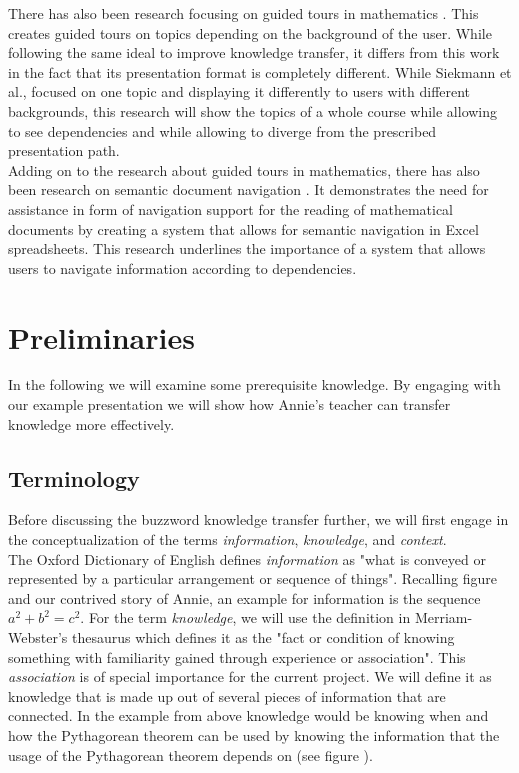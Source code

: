\documentclass[twoside, 12pt]{article}
\begin{document}
There has also been research focusing on guided tours in mathematics \cite{SieBen:acgap00}. This creates guided tours on topics depending on the background of the user. While following the same ideal to improve knowledge transfer, it differs from this work in the fact that its presentation format is completely different. While Siekmann et al., focused on one topic and displaying it differently to users with different backgrounds, this research will show the topics of a whole course while allowing to see dependencies and while allowing to diverge from the prescribed presentation path.\\

Adding on to the research about guided tours in mathematics, there has also been research on semantic document navigation \cite{Koh:NavigationInMathDocs2012}. It demonstrates the need for assistance in form of navigation support for the reading of mathematical documents by creating a system that allows for semantic navigation in Excel spreadsheets. This research underlines the importance of a system that allows users to navigate information according to dependencies.\\
  
\section{Preliminaries}
\label{sec:preliminaries}

In the following we will examine some prerequisite knowledge. By engaging with our example presentation we will show how Annie's teacher can transfer knowledge more effectively.\\

\subsection{Terminology}
\label{sec:terminology}

Before discussing the buzzword knowledge transfer further, we will first engage in the conceptualization of the terms \textit{information}, \textit{knowledge}, and \textit{context}.\\

The Oxford Dictionary of English \cite{OED:npentrel14} defines \textit{information} as "what is conveyed or represented by a particular arrangement or sequence of things". Recalling figure %
 and our contrived story of Annie, an example for information is the sequence \textit{$a^2 + b^2 = c^2$}. For the term \textit{knowledge}, we will use the definition in Merriam-Webster's thesaurus \cite{Webster:npentrel14} which defines it as the "fact or condition of knowing something with familiarity gained through experience or association". This \textit{association} is of special importance for the current project. We will define it as knowledge that is made up out of several pieces of information that are connected. In the example from above knowledge would be knowing when and how the Pythagorean theorem can be used by knowing the information that the usage of the Pythagorean theorem depends on (see figure %
 ).\\ 
\end{document}
